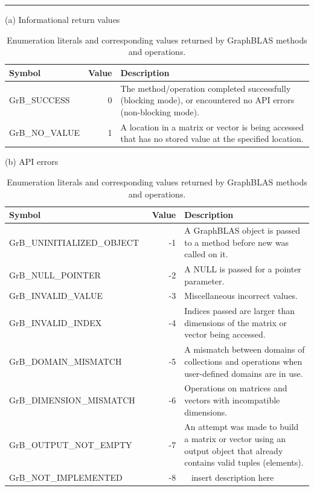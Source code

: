 \begin{table}[bh]
\hrule
\begin{center}
\caption{Enumeration literals and corresponding values returned by GraphBLAS methods and operations.}
\label{Tab:GrBInfoValues}

\vspace{1\baselineskip}
(a) Informational return values
\vspace{1\baselineskip}

\begin{tabular}{l|r|p{4.45in}}
Symbol    & Value & Description \\ \hline
{\sf GrB\_SUCCESS}     &  0 & The method/operation completed successfully (blocking mode), or encountered no API errors (non-blocking mode). \\
{\sf GrB\_NO\_VALUE}   &  1 & A location in a matrix or vector is being accessed that has no stored value at the specified location.\\
\end{tabular}

\vspace{1\baselineskip}
(b) API errors
\vspace{1\baselineskip}

\begin{tabular}{l|r|p{3.45in}}
Symbol    & Value & Description \\ \hline
{\sf GrB\_UNINITIALIZED\_OBJECT} & -1 & A GraphBLAS object is passed to a method before {\sf new} was called on it.\\
{\sf GrB\_NULL\_POINTER}         & -2 & A NULL is passed for a pointer parameter. \\
{\sf GrB\_INVALID\_VALUE}        & -3 & Miscellaneous incorrect values. \\
{\sf GrB\_INVALID\_INDEX}        & -4 & Indices passed are larger than dimensions of the matrix or vector being accessed. \\
{\sf GrB\_DOMAIN\_MISMATCH}      & -5 & A mismatch between domains of collections and operations when user-defined domains are in use.\\
{\sf GrB\_DIMENSION\_MISMATCH}~~ & -6 & Operations on matrices and vectors with incompatible dimensions. \\
{\sf GrB\_OUTPUT\_NOT\_EMPTY}    & -7 & An attempt was made to build a matrix or vector using an output object that already contains valid tuples (elements).\\
{\sf GrB\_NOT\_IMPLEMENTED}      & -8 & ~{\color{red} insert description here} 
\end{tabular}


\end{center}
\end{table}

